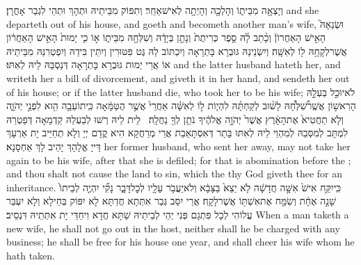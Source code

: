 {וְיָצְאָ֖ה מִבֵּית֑וֹ וְהָלְכָ֖ה וְהָיְתָ֥ה לְאִישׁ\maqqaf אַחֵֽר׃}
{וְתִפּוֹק מִבֵּיתֵיהּ וּתְהָךְ וּתְהֵי לִגְבַר אָחֳרָן׃}
{and she departeth out of his house, and goeth and becometh another man’s wife,}{}
{וּשְׂנֵאָהּ֮ הָאִ֣ישׁ הָאַחֲרוֹן֒ וְכָ֨תַב לָ֜הּ סֵ֤פֶר כְּרִיתֻת֙ וְנָתַ֣ן בְּיָדָ֔הּ וְשִׁלְּחָ֖הּ מִבֵּית֑וֹ א֣וֹ כִ֤י יָמוּת֙ הָאִ֣ישׁ הָאַחֲר֔וֹן אֲשֶׁר\maqqaf לְקָחָ֥הּ ל֖וֹ לְאִשָּֽׁה׃}
{וְיִשְׂנֵינַהּ גּוּבְרָא בָּתְרָאָה וְיִכְתּוֹב לַהּ גֶּט פִּטּוּרִין וְיִתֵּין בִּידַהּ וְיִפְטְרִנַּהּ מִבֵּיתֵיהּ אוֹ אֲרֵי יְמוּת גּוּבְרָא בָּתְרָאָה דְּנַסְבַּהּ לֵיהּ לְאִתּוּ׃}
{and the latter husband hateth her, and writeth her a bill of divorcement, and giveth it in her hand, and sendeth her out of his house; or if the latter husband die, who took her to be his wife;}{}
{לֹא\maqqaf יוּכַ֣ל בַּעְלָ֣הּ הָרִאשׁ֣וֹן אֲשֶֽׁר\maqqaf שִׁ֠לְּחָ֠הּ לָשׁ֨וּב לְקַחְתָּ֜הּ לִהְי֧וֹת ל֣וֹ לְאִשָּׁ֗ה אַחֲרֵי֙ אֲשֶׁ֣ר הֻטַּמָּ֔אָה כִּֽי\maqqaf תוֹעֵבָ֥ה הִ֖וא לִפְנֵ֣י יְהֹוָ֑ה וְלֹ֤א תַחֲטִיא֙ אֶת\maqqaf הָאָ֔רֶץ אֲשֶׁר֙ יְהֹוָ֣ה אֱלֹהֶ֔יךָ נֹתֵ֥ן לְךָ֖ נַחֲלָֽה׃ \setuma }
{לֵית לֵיהּ רְשׁוּ לְבַעְלַהּ קַדְמָאָה דְּפַטְרַהּ לִמְתָּב לְמִסְּבַהּ לְמִהְוֵי לֵיהּ לְאִתּוּ בָּתַר דְּאִסְתָּאַבַת אֲרֵי מְרַחֲקָא הִיא קֳדָם יְיָ וְלָא תְחַיֵּיב יָת אַרְעָךְ דַּייָ אֱלָהָךְ יָהֵיב לָךְ אַחְסָנָא׃}
{her former husband, who sent her away, may not take her again to be his wife, after that she is defiled; for that is abomination before the \lord; and thou shalt not cause the land to sin, which the \lord\space thy God giveth thee for an inheritance.}{}
{כִּֽי\maqqaf יִקַּ֥ח אִישׁ֙ אִשָּׁ֣ה חֲדָשָׁ֔ה לֹ֤א יֵצֵא֙ בַּצָּבָ֔א וְלֹא\maqqaf יַעֲבֹ֥ר עָלָ֖יו לְכׇל\maqqaf דָּבָ֑ר נָקִ֞י יִהְיֶ֤ה לְבֵיתוֹ֙ שָׁנָ֣ה אֶחָ֔ת וְשִׂמַּ֖ח אֶת\maqqaf אִשְׁתּ֥וֹ אֲשֶׁר\maqqaf לָקָֽח׃}
{אֲרֵי יִסַּב גְּבַר אִתְּתָא חֲדַתָּא לָא יִפּוֹק בְּחֵילָא וְלָא יִעְבַּר עֲלוֹהִי לְכָל פִּתְגָם פְּנִי יְהֵי לְבֵיתֵיהּ שַׁתָּא חֲדָא וִיחַדֵּי יָת אִתְּתֵיהּ דִּנְסֵיב׃}
{When a man taketh a new wife, he shall not go out in the host, neither shall he be charged with any business; he shall be free for his house one year, and shall cheer his wife whom he hath taken.}{}
